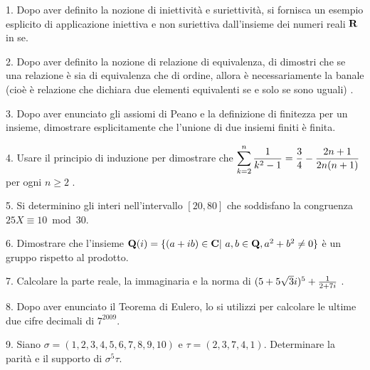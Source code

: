 \item{1.} Dopo aver definito la nozione di iniettivit\`a e suriettivit\`a, si fornisca un esempio esplicito di
applicazione iniettiva e non suriettiva dall'insieme dei numeri reali ${\bf R}$ in se.
\ve\vs   %
\item{2.} Dopo aver definito la nozione di relazione di equivalenza, di dimostri che
se una relazione \`e sia di equivalenza che di ordine, allora \`e necessariamente
la banale (cio\`e \`e relazione che dichiara due elementi equivalenti se e solo se
sono uguali)%
.\vv
\item{3.} Dopo aver enunciato gli assiomi di Peano e la
definizione di finitezza per un insieme, dimostrare esplicitamente
che l'unione di due insiemi finiti \`e finita.
\ve\vs   %
\item{4.} Usare il principio di induzione per dimostrare che $\displaystyle{\sum_{k=2}^n{1\over k^2-1}={3\over4}-{2n+1\over2n(n+1)}}$ per ogni $n\ge2$
.\ve\vs   %
\item{5.} Si determinino gli interi nell'intervallo $[20,80]$ che soddisfano la congruenza $25X\equiv 10\bmod 30$.
\vv
\item{6.} Dimostrare che l'insieme
${\bf Q}(i)=\{(a+ib)\in{\bf C}|\ a,b\in{\bf Q}, a^2+b^2\neq0\}$
\`e un gruppo rispetto al prodotto.
\ve\vs   %
\item{7.} %
Calcolare la parte reale, la immaginaria e la norma di $(5+5\sqrt{3}i)^5+{1\over2+7i}$ .\ve \vs  %
\item{8.} Dopo aver enunciato il Teorema di Eulero, lo si utilizzi per calcolare
le ultime due cifre decimali di $7^{2009}$.
\vv
\item{9.} %
Siano $\sigma=(1,2,3,4,5,6,7,8,9,10)$ e $\tau=(2,3,7,4,1)$.
Determinare la parit\`a e il supporto di  $\sigma^5\tau$.\ \ve %
\bye
